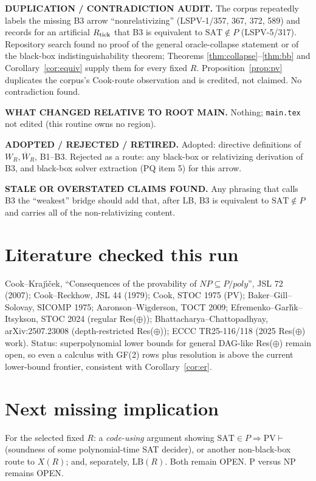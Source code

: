 \documentclass[11pt]{article}
\theoremstyle{definition}
\theoremstyle{remark}
\newcommand{\SAT}{\mathrm{SAT}}
\newcommand{\Wb}{\overline W}
\begin{document}
\textbf{DUPLICATION / CONTRADICTION AUDIT.} The corpus repeatedly labels the missing B3 arrow
``nonrelativizing'' (LSPV-1/357, 367, 372, 589) and records for an artificial $R_{\rm tick}$ that
B3 is equivalent to $\SAT\notin P$ (LSPV-5/317). Repository search found no proof of the general
oracle-collapse statement or of the black-box indistinguishability theorem; Theorems
\ref{thm:collapse}--\ref{thm:bb} and Corollary~\ref{cor:equiv} supply them for every fixed $R$.
Proposition~\ref{prop:pv} duplicates the corpus's Cook-route observation and is credited, not
claimed. No contradiction found.

\textbf{WHAT CHANGED RELATIVE TO ROOT MAIN.} Nothing; \texttt{main.tex} not edited (this routine
owns no region).

\textbf{ADOPTED / REJECTED / RETIRED.} Adopted: directive definitions of $W_R,\Wb_R$, B1--B3.
Rejected as a route: any black-box or relativizing derivation of B3, and black-box solver
extraction (PQ item 5) for this arrow.

\textbf{STALE OR OVERSTATED CLAIMS FOUND.} Any phrasing that calls B3 the ``weakest'' bridge
should add that, after LB, B3 is equivalent to $\SAT\notin P$ and carries all of the
non-relativizing content.

\section{Literature checked this run}
Cook--Kraj\'{\i}\v{c}ek, ``Consequences of the provability of $NP\subseteq P/poly$'', JSL 72
(2007); Cook--Reckhow, JSL 44 (1979); Cook, STOC 1975 (PV); Baker--Gill--Solovay, SICOMP 1975;
Aaronson--Wigderson, TOCT 2009; Efremenko--Garl\'{\i}k--Itsykson, STOC 2024 (regular
Res($\oplus$)); Bhattacharya--Chattopadhyay, arXiv:2507.23008 (depth-restricted Res($\oplus$));
ECCC TR25-116/118 (2025 Res($\oplus$) work). Status: superpolynomial lower bounds for general
DAG-like Res($\oplus$) remain open, so even a calculus with GF(2) rows plus resolution is above
the current lower-bound frontier, consistent with Corollary~\ref{cor:er}.

\section{Next missing implication}
For the selected fixed $R$: a \emph{code-using} argument showing
$\SAT\in P\Rightarrow\mathrm{PV}\vdash$ (soundness of some polynomial-time SAT decider), or
another non-black-box route to $X(R)$; and, separately, $\mathrm{LB}(R)$. Both remain OPEN.
P versus NP remains OPEN.
\end{document}
